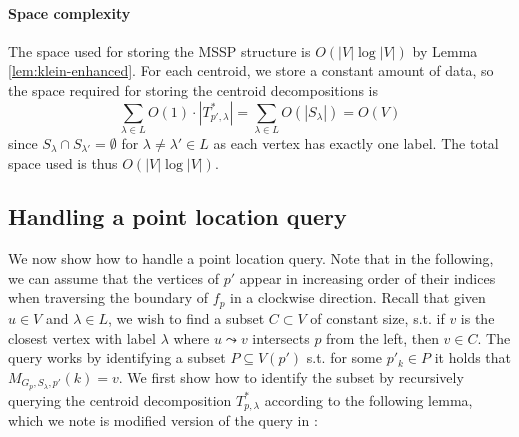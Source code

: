 \documentclass[a4paper,UKenglish,cleveref, autoref, thm-restate]{article}
\begin{document}
\paragraph*{Space complexity}
The space used for storing the MSSP structure is $O(|V| \log |V|)$ by Lemma \ref{lem:klein-enhanced}. For each centroid, we store a constant amount of data, so the space required for storing the centroid decompositions is
$$\sum_{\lambda \in L} O(1) \cdot |T^*_{p',\lambda}| = \sum_{\lambda \in L} O(|S_\lambda|) = O(V)$$
since $S_\lambda \cap S_{\lambda'} = \emptyset$ for $\lambda \neq \lambda' \in L$ as each vertex has exactly one label. The total space used is thus $O(|V| \log |V|)$.

\subsection{Handling a point location query}
We now show how to handle a point location query. Note that in the following, we can assume that the vertices of $p'$ appear in increasing order of their indices when traversing the boundary of $f_p$ in a clockwise direction. Recall that given $u \in V$ and $\lambda \in L$, we wish to find a subset $C \subset V$ of constant size, s.t. if $v$ is the closest vertex with label $\lambda$ where $u \leadsto v$ intersects $p$ from the left, then $v \in C$. The query works by identifying a subset $P \subseteq V(p')$ s.t. for some $p'_k \in P$ it holds that $M_{G_p,S_\lambda,p'}(k) = v$. We first show how to identify the subset by recursively querying the centroid decomposition $T^*_{p,\lambda}$ according to the following lemma, which we note is modified version of the query in \cite{Gawrychowski2018}:
\end{document}
